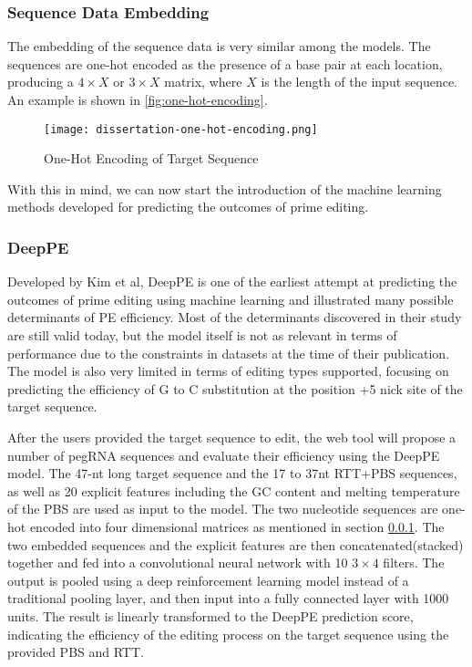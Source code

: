 \documentclass[12pt]{article}
\begin{document}
\subsubsection{Sequence Data Embedding}
\label{sec:embedding}

The embedding of the sequence data is very similar among the models. The sequences are one-hot encoded as the presence of a base pair at each location, producing a $4\times X$ or $3\times X$ matrix, where $X$ is the length of the input sequence. An example is shown in \autoref{fig:one-hot-encoding}.

\begin{figure}[ht]
    \centering
    \texttt{[image: dissertation-one-hot-encoding.png]}
    \caption{One-Hot Encoding of Target Sequence}
    \label{fig:one-hot-encoding}
\end{figure}

With this in mind, we can now start the introduction of the machine learning methods developed for predicting the outcomes of prime editing.

\subsubsection{DeepPE}

Developed by Kim et al, DeepPE is one of the earliest attempt at predicting the outcomes of prime editing using machine learning and illustrated many possible determinants of PE efficiency. Most of the determinants discovered in their study are still valid today, but the model itself is not as relevant in terms of performance due to the constraints in datasets at the time of their publication. The model is also very limited in terms of editing types supported, focusing on predicting the efficiency of G to C substitution at the position +5 nick site of the target sequence. 

After the users provided the target sequence to edit, the web tool will propose a number of pegRNA sequences and evaluate their efficiency using the DeepPE model. The 47-nt long target sequence and the 17 to 37nt RTT+PBS sequences, as well as 20 explicit features including the GC content and melting temperature of the PBS are used as input to the model. The two nucleotide sequences are one-hot encoded into four dimensional matrices as mentioned in section \ref{sec:embedding}. The two embedded sequences and the explicit features are then concatenated(stacked) together and fed into a convolutional neural network with 10 $3 \times 4$ filters. The output is pooled using a deep reinforcement learning model instead of a traditional pooling layer, and then input into a fully connected layer with 1000 units. The result is linearly transformed to the DeepPE prediction score, indicating the efficiency of the editing process on the target sequence using the provided PBS and RTT.
\end{document}
